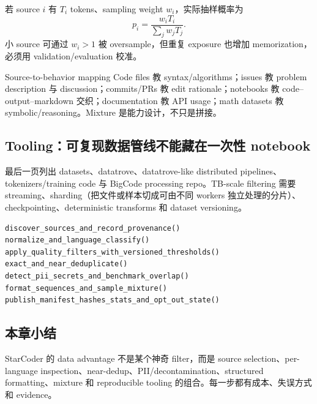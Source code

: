 若 source $i$ 有 $T_i$ tokens、sampling weight $w_i$，实际抽样概率为
\[
p_i=\frac{w_iT_i}{\sum_j w_jT_j}.
\]
小 source 可通过 $w_i>1$ 被 oversample，但重复 exposure 也增加 memorization，必须用 validation/evaluation 校准。

\begin{knowledgebox}{Source-to-behavior mapping}
Code files 教 syntax/algorithms；issues 教 problem description 与 discussion；commits/PRs 教 edit rationale；notebooks 教 code--output--markdown 交织；documentation 教 API usage；math datasets 教 symbolic/reasoning。Mixture 是能力设计，不只是拼接。
\end{knowledgebox}

\subsection{Tooling：可复现数据管线不能藏在一次性 notebook}

最后一页列出 datasets、datatrove、datatrove-like distributed pipelines、tokenizers/training code 与 BigCode processing repo。TB-scale filtering 需要 streaming、sharding（把文件或样本切成可由不同 workers 独立处理的分片）、checkpointing、deterministic transforms 和 dataset versioning。


\begin{lstlisting}[caption={可复现数据管线的阶段契约}]
discover_sources_and_record_provenance()
normalize_and_language_classify()
apply_quality_filters_with_versioned_thresholds()
exact_and_near_deduplicate()
detect_pii_secrets_and_benchmark_overlap()
format_sequences_and_sample_mixture()
publish_manifest_hashes_stats_and_opt_out_state()
\end{lstlisting}

\subsection{本章小结}

StarCoder 的 data advantage 不是某个神奇 filter，而是 source selection、per-language inspection、near-dedup、PII/decontamination、structured formatting、mixture 和 reproducible tooling 的组合。每一步都有成本、失误方式和 evidence。

